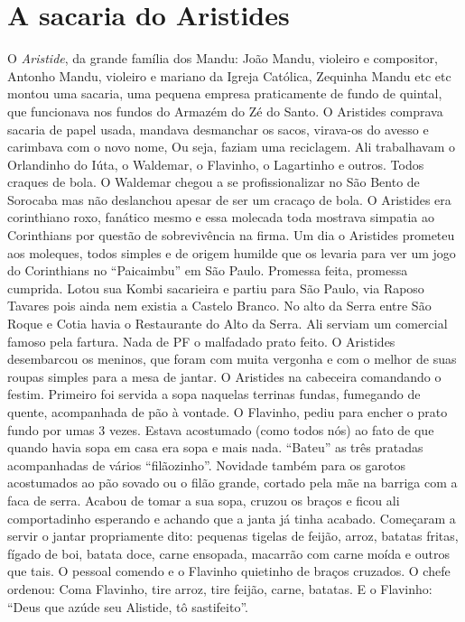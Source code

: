 \documentclass[12pt,brazil,]{book}
\begin{document}
\section{A sacaria do Aristides}\label{a-sacaria-do-aristides}

O \emph{Aristide}, da grande família dos Mandu: João Mandu, violeiro e
compositor, Antonho Mandu, violeiro e mariano da Igreja Católica,
Zequinha Mandu etc etc montou uma sacaria, uma pequena empresa
praticamente de fundo de quintal, que funcionava nos fundos do Armazém
do Zé do Santo. O Aristides comprava sacaria de papel usada, mandava
desmanchar os sacos, virava-os do avesso e carimbava com o novo nome, Ou
seja, faziam uma reciclagem. Ali trabalhavam o Orlandinho do Iúta, o
Waldemar, o Flavinho, o Lagartinho e outros. Todos craques de bola. O
Waldemar chegou a se profissionalizar no São Bento de Sorocaba mas não
deslanchou apesar de ser um cracaço de bola. O Aristides era corinthiano
roxo, fanático mesmo e essa molecada toda mostrava simpatia ao
Corinthians por questão de sobrevivência na firma. Um dia o Aristides
prometeu aos moleques, todos simples e de origem humilde que os levaria
para ver um jogo do Corinthians no ``Paicaimbu'' em São Paulo. Promessa
feita, promessa cumprida. Lotou sua Kombi sacarieira e partiu para São
Paulo, via Raposo Tavares pois ainda nem existia a Castelo Branco. No
alto da Serra entre São Roque e Cotia havia o Restaurante do Alto da
Serra. Ali serviam um comercial famoso pela fartura. Nada de PF o
malfadado prato feito. O Aristides desembarcou os meninos, que foram com
muita vergonha e com o melhor de suas roupas simples para a mesa de
jantar. O Aristides na cabeceira comandando o festim. Primeiro foi
servida a sopa naquelas terrinas fundas, fumegando de quente,
acompanhada de pão à vontade. O Flavinho, pediu para encher o prato
fundo por umas 3 vezes. Estava acostumado (como todos nós) ao fato de
que quando havia sopa em casa era sopa e mais nada. ``Bateu'' as três
pratadas acompanhadas de vários ``filãozinho''. Novidade também para os
garotos acostumados ao pão sovado ou o filão grande, cortado pela mãe na
barriga com a faca de serra. Acabou de tomar a sua sopa, cruzou os
braços e ficou ali comportadinho esperando e achando que a janta já
tinha acabado. Começaram a servir o jantar propriamente dito: pequenas
tigelas de feijão, arroz, batatas fritas, fígado de boi, batata doce,
carne ensopada, macarrão com carne moída e outros que tais. O pessoal
comendo e o Flavinho quietinho de braços cruzados. O chefe ordenou: Coma
Flavinho, tire arroz, tire feijão, carne, batatas. E o Flavinho: ``Deus
que azúde seu Alistide, tô sastifeito''.
\end{document}
